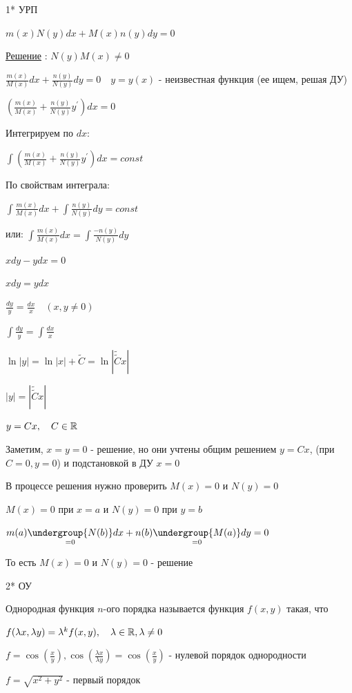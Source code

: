 \documentclass[12pt]{article}
\begin{document}
    1* УРП

    \Def $m(x)N(y)dx + M(x)n(y)dy = 0$

    \underline{Решение} : $N(y)M(x) \neq 0$

    $\frac{m(x)}{M(x)}dx + \frac{n(y)}{N(y)}dy = 0 \quad y = y(x)$ - неизвестная функция (ее ищем, решая ДУ)

    $(\frac{m(x)}{M(x)} + \frac{n(y)}{N(y)}y^\prime)dx = 0$

    Интегрируем по $dx$:

    $\int \left(\frac{m(x)}{M(x)} + \frac{n(y)}{N(y)}y^\prime\right)dx = const$

    По свойствам интеграла:

    $\int \frac{m(x)}{M(x)}dx + \int\frac{n(y)}{N(y)}dy = const$

    или: $\int \frac{m(x)}{M(x)}dx = \int\frac{-n(y)}{N(y)}dy$

    \Ex $xdy - ydx = 0$

    $xdy = ydx$

    $\frac{dy}{y} = \frac{dx}{x} \quad (x, y \neq 0)$

    $\int \frac{dy}{y} = \int \frac{dx}{x}$

    $\ln|y| = \ln|x| + \tilde{C} = \ln|\tilde{\tilde{C}}x|$

    $|y| = |\tilde{\tilde{C}}x|$

    $y = Cx, \quad C \in \mathbb{R}$

    Заметим, $x = y = 0$ - решение, но они учтены общим решением $y = Cx$, (при $C = 0, y = 0$) и подстановкой в ДУ $x = 0$

    \Nota В процессе решения нужно проверить $M(x) = 0$ и $N(y) = 0$

    $M(x) = 0$ при $x = a$ и $N(y) = 0$ при $y = b$

    $m(a)\underset{=0}{\undergroup{N(b)}}dx + n(b)\underset{=0}{\undergroup{M(a)}}dy = 0$

    То есть $M(x) = 0$ и $N(y) = 0$ - решение

    2* ОУ

     Однородная функция $n$-ого порядка называется функция $f(x, y)$ такая, что

    $f(\lambda x, \lambda y) = \lambda^k f(x, y), \quad \lambda \in \mathbb{R}, \lambda \neq 0$

    \Ex $f = \cos\left(\frac{x}{y}\right), \cos(\frac{\lambda x}{\lambda y}) = \cos(\frac{x}{y})$ - нулевой порядок однородности

    $f = \sqrt{x^2 + y^2}$ - первый порядок
\end{document}
